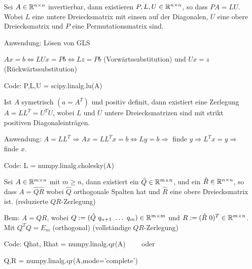 
\vspace{1\baselineskip}

\underline{}

Sei $A \in \mathbb{R}^{n \times n}$ invertierbar, dann existieren $P,L,U \in \mathbb{R}^{n \times n}$, so
dass $PA = LU$. Wobei $L$ eine untere Dreiecksmatrix mit einsen auf der Diagonalen,
$U$ eine obere Dreiecksmatrix und $P$ eine Permutationsmatrix sind.

Anwendung: Lösen von GLS

$Ax = b \Leftrightarrow LU x = Pb \Leftrightarrow Lz = Pb$ (Vorwärtssubstitution) und
$U x = z$ (Rückwärtssubstitution)

Code: P,L,U = scipy.linalg.lu(A)

\pagebreak

\underline{}

Ist $A$ symetrisch $(a=A^T)$ und positiv definit, dann existiert eine Zerlegung
$A=LL^T = U^T U$, wobei $L$ und $U$ untere Dreiecksmatrizen sind mit strikt positiven
Diagonaleinträgen.

Anwendung: $A=LL^T  \Rightarrow Ax = LL^T x = b \Leftrightarrow L y = b \Rightarrow$
    finde $y \Rightarrow L^T x = y \Rightarrow$ finde $x$.

Code: L = numpy.linalg.cholesky(A)

\vspace{1\baselineskip}

\underline{}

Sei $A \in \mathbb{R}^{m \times n}$ mit $m \geq n$, dann existiert ein $\hat{Q} \in \mathbb{R}^{m \times n}$,
und ein $\hat{R} \in \mathbb{R}^{n \times n}$, so dass $A = \hat{Q} \hat{R}$ wobei $\hat{Q}$
orthogonale Spalten hat und $\hat{R}$ eine obere Dreiecksmatrix ist.
(reduzierte $QR$-Zerlegung)

Bem: $A = QR$, wobei $Q := (\hat{Q} \ q_{n+1} \ \dots \ q_m) \in \mathbb{R}^{m \times m}$ und
$R:= (\hat{R} \ 0)^T \in \mathbb{R}^{m \times n}$. Mit $Q^T Q = E_m$ (orthogonal)
(vollständige $QR$-Zerlegung)

Code: Qhat, Rhat = numpy.linalg.qr(A) \ \ \ \ oder 

\hspace{27pt} Q,R = numpy.linalg.qr(A,mode='complete')

